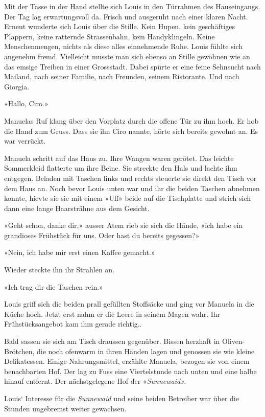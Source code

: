 Mit der Tasse in der Hand stellte sich Louis in den Türrahmen des
Hauseingangs. Der Tag lag erwartungsvoll da. Frisch und ausgeruht nach
einer klaren Nacht. Erneut wunderte sich Louis über die Stille. Kein
Hupen, kein geschäftiges Plappern, keine ratternde Strassenbahn, kein
Handyklingeln. Keine Menschenmengen, nichts als diese alles einnehmende
Ruhe. Louis fühlte sich angenehm fremd. Vielleicht musste man sich
ebenso an Stille gewöhnen wie an das emsige Treiben in einer Grossstadt.
Dabei spürte er eine feine Sehnsucht nach Mailand, nach seiner Familie,
nach Freunden, seinem Ristorante. Und nach Giorgia.

«Hallo, Ciro.»

Manuelas Ruf klang über den Vorplatz durch die offene Tür zu ihm hoch.
Er hob die Hand zum Gruss. Dass sie ihn Ciro nannte, hörte sich bereits
gewohnt an. Es war verrückt.

Manuela schritt auf das Haus zu. Ihre Wangen waren gerötet. Das leichte
Sommerkleid flatterte um ihre Beine. Sie streckte den Hals und lachte
ihm entgegen. Beladen mit Taschen links und rechts steuerte sie direkt
den Tisch vor dem Haus an. Noch bevor Louis unten war und ihr die beiden
Taschen abnehmen konnte, hievte sie sie mit einem «Uff» beide auf die
Tischplatte und strich sich dann eine lange Haarsträhne aus dem Gesicht.

«Geht schon, danke dir,» ausser Atem rieb sie sich die Hände, «ich habe
ein grandioses Frühstück für uns. Oder hast du bereits gegessen?»

«Nein, ich habe mir erst einen Kaffee gemacht.»

Wieder steckte ihn ihr Strahlen an.

«Ich trag dir die Taschen rein.»

Louis griff sich die beiden prall gefüllten Stoffsäcke und ging vor
Manuela in die Küche hoch. Jetzt erst nahm er die Leere in seinem Magen
wahr. Ihr Frühstücksangebot kam ihm gerade richtig..

Bald sassen sie sich am Tisch draussen gegenüber. Bissen herzhaft in
Oliven- Brötchen, die noch ofenwarm in ihren Händen lagen und genossen
sie wie kleine Delikatessen. Einige Nahrungsmittel, erzählte Manuela,
bezogen sie von einem benachbarten Hof. Der lag zu Fuss eine
Viertelstunde nach unten und eine halbe hinauf entfernt. Der
nächstgelegene Hof der «\emph{Sunnewaid».}

Louis` Interesse für die \emph{Sunnewaid} und seine beiden Betreiber war
über die Stunden ungebremst weiter gewachsen.

